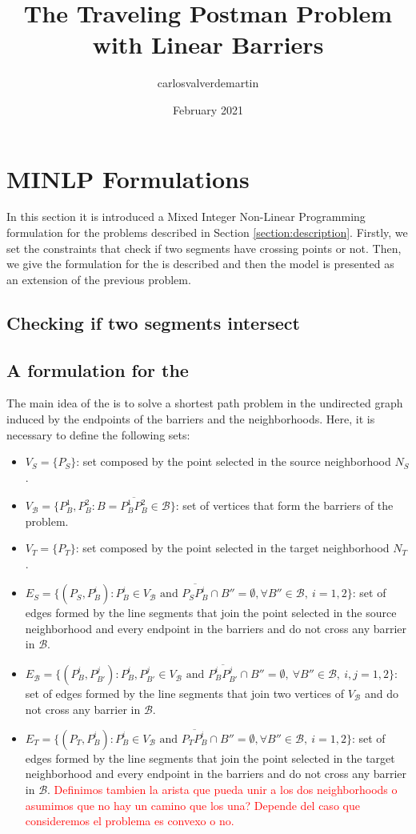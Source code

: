 \documentclass[a4paper]{elsarticle}
\title{The Traveling Postman Problem with Linear Barriers}
\author{carlosvalverdemartin }
\date{February 2021}
\newcommand{\SPP}{{\sf{H-SPP-S} \xspace}}
\newcommand{\TSP}{{\sf{H-TSP-S} \xspace}}
\newcommand{\B}{{\mathcal B}}
\newcommand{\VB}{{V^{}_{\mathcal B}}}
\newcommand{\EB}{{E^{}_{\mathcal B}}}
\newcommand{\VS}{{V^{}_{S}}}
\newcommand{\ES}{{E^{}_{S}}}
\newcommand{\VT}{{V^{}_{T}}}
\newcommand{\ET}{{E^{}_{T}}}
\begin{document}
\section{MINLP Formulations}

In this section it is introduced a Mixed Integer Non-Linear Programming formulation for the problems described in Section \ref{section:description}. Firstly, we set the constraints that check if two segments have crossing points or not. Then, we give the formulation for the \SPP is described and then the model \TSP is presented as an extension of the previous problem.

\subsection{Checking if two segments intersect}


\subsection{A formulation for the \SPP}
The main idea of the \SPP is to solve a shortest path problem in the undirected graph induced by the endpoints of the barriers and the neighborhoods. Here, it is necessary to define the following sets:
\begin{itemize}
\item $\VS=\{P_S\}$: set composed by the point selected in the source neighborhood $N_S$.
\item $\VB=\{P^1_B, P^2_B:B=\overline{P^1_B P^2_B}\in \mathcal B\}$: set of vertices that form the barriers of the problem.
\item $\VT=\{P^{}_T\}$: set composed by the point selected in the target neighborhood $N_T$.
\item $\ES=\{(P_S, P^i_{B}):P^i_B\in V_\B\text{ and } \overline{P_SP^i_B}\cap B''=\emptyset,\forall B''\in\B,\:i=1,2\}$: set of edges formed by the line segments that join the point selected in the source neighborhood and every endpoint in the barriers and do not cross any barrier in $\B$.
\item $\EB=\{(P^{i}_B, P^{j}_{B'}):P^i_B, P^j_{B'}\in \VB \text{ and } \overline{P^i_B P^j_{B'}}\cap B''=\emptyset,\:\forall B''\in\mathcal B,\:i, j=1,2\}$: set of edges formed by the line segments that join two vertices of $V_{\mathcal B}$ and do not cross any barrier in $\B$.
\item $\ET=\{(P^{}_T, P^i_{B}):P^i_B\in V_\B\text{ and } \overline{P^{}_TP^i_B}\cap B''=\emptyset,\forall B''\in\B,\:i=1,2\}$: set of edges formed by the line segments that join the point selected in the target neighborhood and every endpoint in the barriers and do not cross any barrier in $\B$.
\textcolor{red}{Definimos tambien la arista que pueda unir a los dos neighborhoods o asumimos que no hay un camino que los una? Depende del caso que consideremos el problema es convexo o no.}
\end{itemize} 
\end{document}
